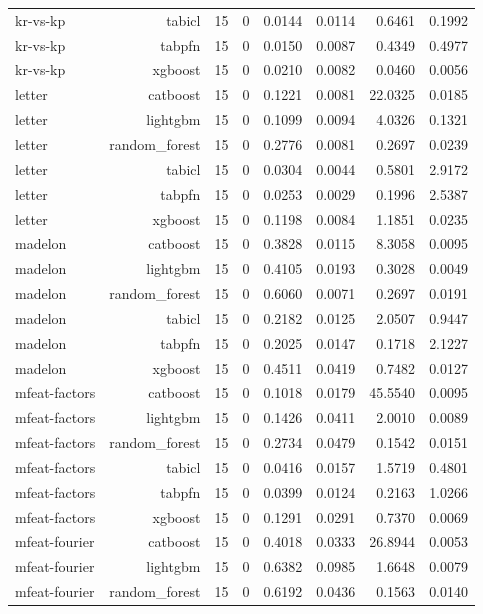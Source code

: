 \begin{table}[htbp]
\begin{tabular}{lrrrrrrr}
kr-vs-kp & tabicl & 15 & 0 & 0.0144 & 0.0114 & 0.6461 & 0.1992 \\
kr-vs-kp & tabpfn & 15 & 0 & 0.0150 & 0.0087 & 0.4349 & 0.4977 \\
kr-vs-kp & xgboost & 15 & 0 & 0.0210 & 0.0082 & 0.0460 & 0.0056 \\
letter & catboost & 15 & 0 & 0.1221 & 0.0081 & 22.0325 & 0.0185 \\
letter & lightgbm & 15 & 0 & 0.1099 & 0.0094 & 4.0326 & 0.1321 \\
letter & random\_forest & 15 & 0 & 0.2776 & 0.0081 & 0.2697 & 0.0239 \\
letter & tabicl & 15 & 0 & 0.0304 & 0.0044 & 0.5801 & 2.9172 \\
letter & tabpfn & 15 & 0 & 0.0253 & 0.0029 & 0.1996 & 2.5387 \\
letter & xgboost & 15 & 0 & 0.1198 & 0.0084 & 1.1851 & 0.0235 \\
madelon & catboost & 15 & 0 & 0.3828 & 0.0115 & 8.3058 & 0.0095 \\
madelon & lightgbm & 15 & 0 & 0.4105 & 0.0193 & 0.3028 & 0.0049 \\
madelon & random\_forest & 15 & 0 & 0.6060 & 0.0071 & 0.2697 & 0.0191 \\
madelon & tabicl & 15 & 0 & 0.2182 & 0.0125 & 2.0507 & 0.9447 \\
madelon & tabpfn & 15 & 0 & 0.2025 & 0.0147 & 0.1718 & 2.1227 \\
madelon & xgboost & 15 & 0 & 0.4511 & 0.0419 & 0.7482 & 0.0127 \\
mfeat-factors & catboost & 15 & 0 & 0.1018 & 0.0179 & 45.5540 & 0.0095 \\
mfeat-factors & lightgbm & 15 & 0 & 0.1426 & 0.0411 & 2.0010 & 0.0089 \\
mfeat-factors & random\_forest & 15 & 0 & 0.2734 & 0.0479 & 0.1542 & 0.0151 \\
mfeat-factors & tabicl & 15 & 0 & 0.0416 & 0.0157 & 1.5719 & 0.4801 \\
mfeat-factors & tabpfn & 15 & 0 & 0.0399 & 0.0124 & 0.2163 & 1.0266 \\
mfeat-factors & xgboost & 15 & 0 & 0.1291 & 0.0291 & 0.7370 & 0.0069 \\
mfeat-fourier & catboost & 15 & 0 & 0.4018 & 0.0333 & 26.8944 & 0.0053 \\
mfeat-fourier & lightgbm & 15 & 0 & 0.6382 & 0.0985 & 1.6648 & 0.0079 \\
mfeat-fourier & random\_forest & 15 & 0 & 0.6192 & 0.0436 & 0.1563 & 0.0140 \\

\end{tabular}
\end{table}

